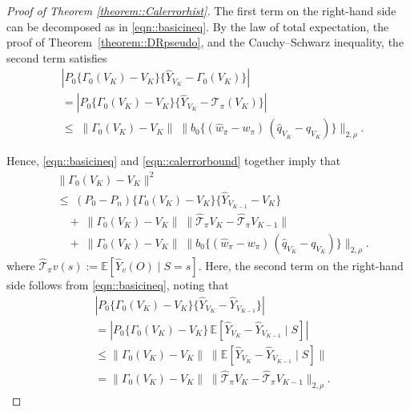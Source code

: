 \documentclass{article}
\theoremstyle{plain}
\theoremstyle{definition}
\theoremstyle{remark}
\begin{document}
\begin{proof}[Proof of Theorem \ref{theorem::Calerrorhist}]
The first term on the right-hand side can be decomposed as in \eqref{eqn::basicineq}.
By the law of total expectation, the proof of Theorem~\ref{theorem::DRpseudo},
and the Cauchy--Schwarz inequality, the second term satisfies
\begin{align*}
&\left|
P_0
\Big\{
\Gamma_0(V_K) - V_K
\Big\}
\Big\{
\widehat Y_{V_K}
- \Gamma_0(V_K)
\Big\}
\right|
\\[0.4em]
&=
\left|
P_0
\Big\{
\Gamma_0(V_K) - V_K
\Big\}
\Big\{
\widehat Y_{V_K}
- \mathcal{T}_{\pi}(V_K)
\Big\}
\right|
\\[0.4em]
&\le\;
\|\Gamma_0(V_K) - V_K\|\;
\big\|
b_0\{(\widehat w_{\pi} - w_{\pi})\,
(\widehat q_{V_K} - q_{V_K})\}
\big\|_{2,\rho}.
\end{align*}

Hence, \eqref{eqn::basicineq} and \eqref{eqn::calerrorbound} together imply that
\begin{equation}
\label{eqn::basicineq2}
\begin{aligned}
&\|\Gamma_0(V_K) - V_K\|^2\\
&\le\;
(P_0 - P_n)
\Big\{
\Gamma_0(V_K) - V_K
\Big\}
\Big\{
\widehat Y_{V_{K-1}}
- V_K
\Big\}
\\[0.4em]
&\quad+\;
\|\Gamma_0(V_K) - V_K\|\;
\big\|
\widehat{\mathcal T}_\pi V_K
- \widehat{\mathcal T}_\pi V_{K-1}
\big\|
\\[0.4em]
&\quad+\;
\|\Gamma_0(V_K) - V_K\|\;
\big\|
b_0\{(\widehat w_{\pi} - w_{\pi})\,
(\widehat q_{V_K} - q_{V_K})\}
\big\|_{2,\rho}.
\end{aligned}
\end{equation}
where $\widehat{\mathcal T}_\pi v(s)
:= \mathbb{E}[\widehat Y_v(O)\mid S=s]$.
Here, the second term on the right-hand side follows from \eqref{eqn::basicineq}, noting that
\begin{align*} &\left| P_0 \Big\{ \Gamma_0(V_K) - V_K \Big\} \Big\{ \widehat Y_{V_K} - \widehat Y_{V_{K-1}} \Big\} \right| \\[0.4em] &= \left| P_0 \Big\{ \Gamma_0(V_K) - V_K \Big\} \,\mathbb{E}\left[ \widehat Y_{V_K} - \widehat Y_{V_{K-1}} \mid S \right] \right| \\[0.4em] &\le \|\Gamma_0(V_K) - V_K\|\; \Big\| \mathbb{E}\left[ \widehat Y_{V_K} - \widehat Y_{V_{K-1}} \mid S \right] \Big\| \\[0.4em] &= \|\Gamma_0(V_K) - V_K\|\; \big\| \widehat{\mathcal T}_\pi V_K - \widehat{\mathcal T}_\pi V_{K-1} \big\|_{2,\rho}. \end{align*}
 





\end{proof}
\end{document}
